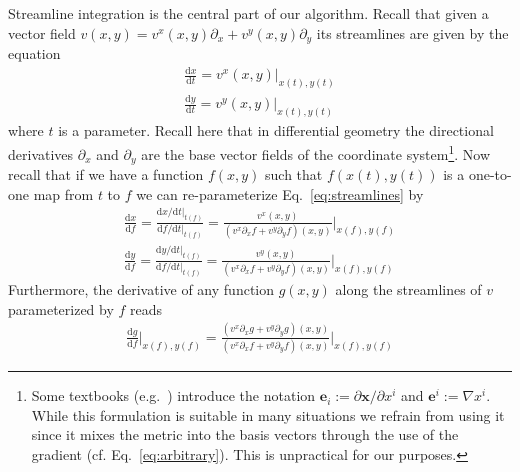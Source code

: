 \documentclass{hitec} %
\renewcommand{\d}{\mathrm{d}}
\renewcommand{\vec}[1]{{\mathbf{#1}}}
\begin{document}
Streamline integration is the central part of our algorithm. Recall that
given a vector field $v(x,y)=v^x(x,y)\partial_x + v^y(x,y)\partial_y$ its streamlines are given by the equation
\begin{subequations}
\begin{align}
  \frac{\d x}{\d t } = v^x(x,y)|_{x(t), y(t)} \\
  \frac{\d y}{\d t } = v^y(x,y)|_{x(t), y(t)}
\end{align}
\label{eq:streamlines}
\end{subequations}
where $t$ is a parameter. Recall here that in differential geometry 
the directional derivatives $\partial_x$ and
$\partial_y$ are the base vector fields of the coordinate system\footnote{ 
  Some textbooks (e.g.~\cite{haeseleer}) introduce the notation $\vec e_i := \partial \vec x /\partial x^i$ 
  and $\vec e^i := \nabla x^i$. 
  While this formulation is suitable in many situations we refrain from 
  using it since it mixes the metric into the basis vectors through the use of 
  the gradient (cf. Eq.~\eqref{eq:arbitrary}). 
  This is unpractical for our purposes.}.
Now recall that if we have a function $f(x,y)$ 
such that $f(x(t), y(t))$ is a one-to-one map from $t$ to $f$ we can re-parameterize
Eq.~\eqref{eq:streamlines} by
\begin{subequations}
\begin{align}
  \frac{\d x}{\d f } = \frac{\d x/\d t|_{t(f)}}{\d f/\d t|_{t(f)}} = 
  \frac{v^x(x,y) }{ (v^x\partial_xf + v^y\partial_yf)(x,y) }\bigg |_{x(f), y(f)}\\
  \frac{\d y}{\d f } = \frac{\d y/\d t|_{t(f)}}{\d f/\d t|_{t(f)}} = 
  \frac{v^y(x,y) }{ (v^x\partial_xf + v^y\partial_yf)(x,y) }\bigg |_{x(f), y(f)}
\end{align}
\label{eq:reparameter}
\end{subequations}
Furthermore, the derivative of any function $g(x,y)$ along the streamlines of $v$ 
parameterized by $f$ reads
\begin{align}
  \frac{\d g}{\d f }\bigg |_{x(f),y(f)} = 
  \frac{(v^x\partial_x g + v^y\partial_y g)(x,y) }{ (v^x\partial_xf + v^y\partial_yf)(x,y) }\bigg |_{x(f),y(f)}
  \label{}
\end{align}
\end{document}
